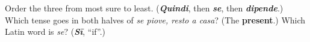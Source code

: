 \begin{tcolorbox}[breakable,colback=teal!4,colframe=teal!35!black,title={Before you move on}]
Order the three from most sure to least. (\emph{\textbf{Quindi}}, then \emph{\textbf{se}}, then \emph{\textbf{dipende}}.) Which tense goes in both halves of \emph{se piove, resto a casa}? (The \textbf{present}.) Which Latin word is \emph{se}? (\emph{\textbf{Sī}}, \textquotedblleft{}if\textquotedblright{}.)
\end{tcolorbox}
